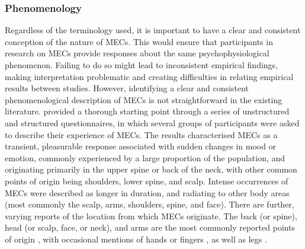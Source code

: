 \subsubsection{Phenomenology}

Regardless of the terminology used, it is important to have a clear and consistent conception of the nature of MECs. This would ensure that participants in research on MECs provide responses about the same psychophysiological phenomenon. Failing to do so might lead to inconsistent empirical findings, making interpretation problematic and creating difficulties in relating empirical results between studies. However, identifying a clear and consistent phenomenological description of MECs is not straightforward in the existing literature. \textcite{goldstein1980} provided a thorough starting point through a series of unstructured and structured questionnaires, in which several groups of participants were asked to describe their experience of MECs. The results characterised MECs as a transient, pleasurable response associated with sudden changes in mood or emotion, commonly experienced by a large proportion of the population, and originating primarily in the upper spine or back of the neck, with other common points of origin being shoulders, lower spine, and scalp. Intense occurrences of MECs were described as longer in duration, and radiating to other body areas (most commonly the scalp, arms, shoulders, spine, and face). There are further, varying reports of the location from which MECs originate. The back (or spine), head (or scalp, face, or neck), and arms are the most commonly reported points of origin \parencite{craig2005, goldstein1980, neidlinger2017, panksepp1995, wassiliwizky2015}, with occasional mentions of hands or fingers \parencite{craig2005}, as well as legs \parencite{wassiliwizky2015}.

